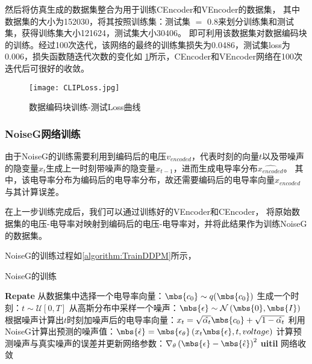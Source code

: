 然后将仿真生成的数据集整合为用于训练CEncoder和VEncoder的数据集，
其中数据集的大小为152030，将其按照训练集：测试集 $=$ 0.8来划分训练集和测试集，获得训练集大小121624，测试集大小30406。
即可利用该数据集对数据编码块的训练。经过100次迭代，该网络的最终的训练集损失为0.0486，测试集loss为0.006，损失函数随迭代次数的变化如
\cref{figure:CLIPLoss}所示，CEncoder和VEncoder网络在100次迭代后可很好的收敛。
\begin{figure}[h]
    \centering
    \texttt{[image: CLIPLoss.jpg]}
    \caption{数据编码块训练-测试Loss曲线}
    \label{figure:CLIPLoss}
\end{figure}

\subsubsection{NoiseG网络训练}

由于NoiseG的训练需要利用到编码后的电压$v_{encoded}$，代表时刻的向量$t$以及带噪声的隐变量$x_t$生成上一时刻带噪声的隐变量$x_{t-1}$，进而生成电导率分布$\hat{x_{encoded}}$。
其中，该电导率分布为编码后的电导率分布，故还需要编码后的电导率向量$x_{encoded}$与其计算误差。

在上一步训练完成后，我们可以通过训练好的VEncoder和CEncoder，
将原始数据集的电压-电导率对映射到编码后的电压-电导率对，并将此结果作为训练NoiseG的数据集。

NoiseG的训练过程如\cref{algorithm:TrainDDPM}所示，

\begin{algorithm}[H]
    
    \caption{NoiseG的训练}
    \begin{algorithmic}[1]
        \State \textbf{Repate}
        \State 从数据集中选择一个电导率向量：$\mbs{c_0} \sim q(\mbs{c_0})$
        \State 生成一个时刻：$t \sim \mathcal{U}\left[0, T\right]$
        \State 从高斯分布中采样一个噪声：$\mbs{\epsilon} \sim \mathcal{N}\left(\mbs{0}, \mbs{I}\right) $
        \State 根据噪声计算出$t$时刻加噪声后的电导率向量：$x_t = \sqrt{\hat{\alpha_t}}\mbs{c_0} + \sqrt{1-\hat{\alpha_t}}$
        \State 利用NoiseG计算出预测的噪声值：$\mbs{\hat{\epsilon}} = \mbs{\epsilon_{\theta}}\left(x_t\mbs{\epsilon}, t, voltage\right)$
        \State 计算预测噪声与真实噪声的误差并更新网络参数：$\nabla_\theta\left(\mbs{\epsilon} - \mbs{\hat{\epsilon}}\right)^2$
       \State \textbf{uitil} 网络收敛
    \end{algorithmic}
    \label{algorithm:TrainDDPM}
\end{algorithm}

